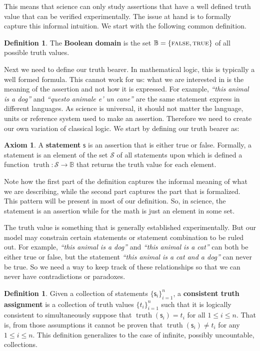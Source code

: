 \documentclass[letterpaper]{article}
\theoremstyle{plain}%
\theoremstyle{definition}
\newtheorem{defn}[thrm]{Definition}
\newtheorem{axiom}[thrm]{Axiom}
\theoremstyle{remark}
\DeclareMathOperator{\truth}{truth}
\def\TRUE{\textsc{true}}
\def\FALSE{\textsc{false}}
\newcommand{\stmt}[1][s] {\mathsf{#1}}
\newcommand{\statement}[1] {\emph{``#1''}}
\begin{document}
This means that science can only study assertions that have a well defined truth value that can be verified experimentally. The issue at hand is to formally capture this informal intuition. We start with the following common definition.

\begin{defn}
	The \textbf{Boolean domain} is the set $\mathbb{B} = \{\FALSE, \TRUE\}$ of all possible truth values.
\end{defn}

Next we need to define our truth bearer. In mathematical logic, this is typically a well formed formula. This cannot work for us: what we are interested in is the meaning of the assertion and not how it is expressed. For example, \statement{this animal is a dog} and \statement{questo animale e' un cane} are the same statement express in different languages. As science is universal, it should not matter the language, units or reference system used to make an assertion. Therefore we need to create our own variation of classical logic. We start by defining our truth bearer as:

\begin{axiom}\label{ax_statement}
	A \textbf{statement} $\stmt$ is an assertion that is either true or false. Formally, a statement is an element of the set $\mathcal{S}$ of all statements upon which is defined a function $\truth: \mathcal{S} \to \mathbb{B}$ that returns the truth value for each element.
\end{axiom}

Note how the first part of the definition captures the informal meaning of what we are describing, while the second part captures the part that is formalized. This pattern will be present in most of our definition. So, in science, the statement is an assertion while for the math is just an element in some set.

The truth value is something that is generally established experimentally. But our model may constrain certain statements or statement combination to be ruled out. For example, \statement{this animal is a dog} and \statement{this animal is a cat} can both be either true or false, but the statement \statement{this animal is a cat and a dog} can never be true. So we need a way to keep track of these relationships so that we can never have contradictions or paradoxes.

\begin{defn}
	Given a collection of statements $\{\stmt_i\}^n_{i=1}$, a \textbf{consistent truth assignment} is a collection of truth values $\{t_i\}^n_{i=1}$ such that it is logically consistent to simultaneously suppose that $\truth(\stmt_i) = t_i$ for all $1 \leq i \leq n$. That is, from those assumptions it cannot be proven that $\truth(\stmt_i) \neq t_i$ for any $1 \leq i \leq n$.  This definition generalizes to the case of infinite, possibly uncountable, collections.
\end{defn}
\end{document}

